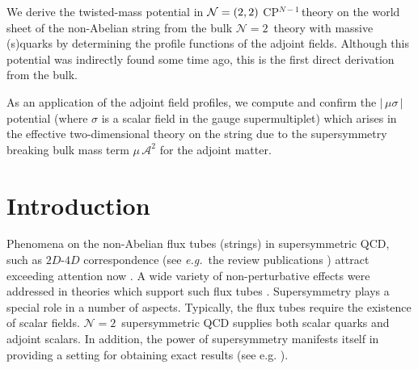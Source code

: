 \documentclass[12pt]{article}
\newcommand{\ntwo}{${\mathcal N}=2$}
\newcommand{\ntwon}{${\mathcal N}=2$}
\newcommand{\ca}{{\mathcal A}}
\newcommand{\cpn}{CP$^{N-1}$\,}
\newcommand{\eg}{{\it e.g.}~}
\begin{document}
\begin{titlepage}
	We derive  the twisted-mass potential in $ {\cal N}=(2,2) $ \cpn theory 
	on the world sheet of the non-Abelian string from the bulk \ntwo\, theory with massive (s)quarks
	by determining the profile functions of the adjoint fields.
	Although this potential was indirectly found some time ago, this is the first  
	direct derivation from the bulk.

	As an application of the adjoint field profiles, we compute and confirm the $ |\, \mu \sigma \,| $ potential 
	(where $\sigma$ is a scalar field in the gauge supermultiplet)
	which arises in the effective two-dimensional theory on the string 
	due to the supersymmetry breaking bulk mass term $ \mu\, \ca^2 $ for the adjoint matter.

\vspace{2cm}


\end{titlepage}




\section{Introduction}
\setcounter{equation}{0}

	Phenomena on the non-Abelian flux tubes (strings)  in supersymmetric QCD, such as $2D$-$4D$ 
	correspondence (see \eg the review publications
	\cite{Trev,SYrev})
	attract exceeding attention now \cite{GGS}.
	A wide variety of non-perturbative effects were addressed in theories 
	which support such flux tubes
	\cite{Shifman:2010id}.
	Supersymmetry plays a special role in a number of aspects.
	Typically, the flux tubes require the existence of scalar fields. 
	\ntwon\, supersymmetric QCD supplies both scalar quarks and adjoint scalars. In addition,
	the power of supersymmetry manifests itself in providing a setting for obtaining
	 exact results (see e.g.
	\cite{Novikov:1983uc,Seiberg:1994rs,Seiberg:1994aj,Shifman:2013ewa}).
\end{document}
